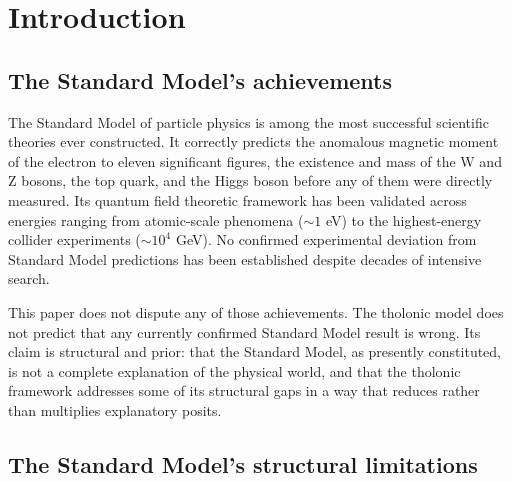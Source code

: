 \documentclass[12pt]{article}
\begin{document}
\begin{abstract}
tholonic-constant expressions identifies
\(4 \cdot e^5 \cdot (\ln 2)^4 = 137.035865\) as the leading numerical
candidate for \(1/\alpha\), with an error of \(-0.98\) ppm and all
exponents being fixed thologram structural values, not fitted
parameters. A second open derivation targets the proton/electron mass
ratio via the known approximation \(6\pi^5 \approx 1836.12\) and its
connection to the tholonic N-weight. The paper includes a systematic
parameter comparison table, explicit falsifiability conditions, and a
prioritized roadmap for the derivations that would, if completed,
constitute the strongest available confirmation of the framework. The
tholonic model is speculative; all claims should be understood as
structurally motivated hypotheses requiring independent verification.
\end{abstract}

\section{Introduction}\label{introduction}

\subsection{The Standard Model's achievements}\label{the-standard-models-achievements}

The Standard Model of particle physics is among the most successful
scientific theories ever constructed. It correctly predicts the
anomalous magnetic moment of the electron to eleven significant figures,
the existence and mass of the W and Z bosons, the top quark, and the
Higgs boson before any of them were directly measured. Its quantum field
theoretic framework has been validated across energies ranging from
atomic-scale phenomena (\(\sim 1\) eV) to the highest-energy collider
experiments (\(\sim 10^4\) GeV). No confirmed experimental deviation
from Standard Model predictions has been established despite decades of
intensive search.

This paper does not dispute any of those achievements. The tholonic
model does not predict that any currently confirmed Standard Model
result is wrong. Its claim is structural and prior: that the Standard
Model, as presently constituted, is not a complete explanation of the
physical world, and that the tholonic framework addresses some of its
structural gaps in a way that reduces rather than multiplies explanatory
posits.

\subsection{The Standard Model's structural limitations}\label{the-standard-models-structural-limitations}
\end{document}
